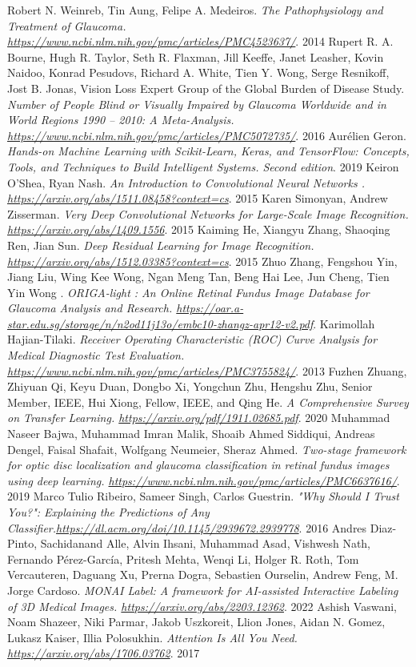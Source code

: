 \documentclass[11pt, a4paper]{article}
\begin{document}
\begin{thebibliography}{9}
\bibitem{}
Robert N. Weinreb, Tin Aung, Felipe A. Medeiros. \emph{The Pathophysiology and Treatment of Glaucoma. \url{https://www.ncbi.nlm.nih.gov/pmc/articles/PMC4523637/}}. 2014
\bibitem{}
Rupert R. A. Bourne, Hugh R. Taylor, Seth R. Flaxman, Jill Keeffe, Janet Leasher, Kovin Naidoo, Konrad Pesudovs, Richard A. White, Tien Y. Wong, Serge Resnikoff, Jost B. Jonas, Vision Loss Expert Group of the Global Burden of Disease Study. \emph{Number of People Blind or Visually Impaired by Glaucoma Worldwide and in World Regions 1990 – 2010: A Meta-Analysis. \url{https://www.ncbi.nlm.nih.gov/pmc/articles/PMC5072735/}}. 2016
\bibitem{}
Aurélien Geron. \emph{Hands-on Machine Learning with Scikit-Learn, Keras, and TensorFlow: Concepts, Tools, and Techniques to Build Intelligent Systems. Second edition}. 2019
\bibitem{}
Keiron O'Shea, Ryan Nash. \emph{An Introduction to Convolutional Neural Networks
. \url{https://arxiv.org/abs/1511.08458?context=cs}}. 2015
\bibitem{}
Karen Simonyan, Andrew Zisserman. \emph{Very Deep Convolutional Networks for Large-Scale Image Recognition. \url{https://arxiv.org/abs/1409.1556}}. 2015
\bibitem{}
Kaiming He, Xiangyu Zhang, Shaoqing Ren, Jian Sun. \emph{Deep Residual Learning for Image Recognition. \url{https://arxiv.org/abs/1512.03385?context=cs}}. 2015
\bibitem{}
Zhuo Zhang, Fengshou Yin, Jiang Liu, Wing Kee Wong,
Ngan Meng Tan, Beng Hai Lee, Jun Cheng, Tien Yin Wong . \emph{ORIGA-light : An Online Retinal Fundus Image Database for Glaucoma Analysis and Research. \url{https://oar.a-star.edu.sg/storage/n/n2od11j13o/embc10-zhangz-apr12-v2.pdf}}. 
\bibitem{}
Karimollah Hajian-Tilaki. \emph{Receiver Operating Characteristic (ROC) Curve Analysis for Medical Diagnostic Test Evaluation. \url{https://www.ncbi.nlm.nih.gov/pmc/articles/PMC3755824/}}. 2013
\bibitem{}
Fuzhen Zhuang, Zhiyuan Qi, Keyu Duan, Dongbo Xi, Yongchun Zhu, Hengshu Zhu, Senior Member, IEEE,
Hui Xiong, Fellow, IEEE, and Qing He. \emph{A Comprehensive Survey on Transfer Learning. \url{https://arxiv.org/pdf/1911.02685.pdf}}. 2020 
\bibitem{}
Muhammad Naseer Bajwa, Muhammad Imran Malik, Shoaib Ahmed Siddiqui, Andreas Dengel, Faisal Shafait, Wolfgang Neumeier, Sheraz Ahmed. \emph{Two-stage framework for optic disc localization and glaucoma classification in retinal fundus images using deep learning. \url{https://www.ncbi.nlm.nih.gov/pmc/articles/PMC6637616/}}. 2019
\bibitem{}
Marco Tulio Ribeiro, Sameer Singh, Carlos Guestrin. \emph{"Why Should I Trust You?": Explaining the Predictions of Any Classifier.\url{https://dl.acm.org/doi/10.1145/2939672.2939778}}. 2016
\bibitem{}
Andres Diaz-Pinto, Sachidanand Alle, Alvin Ihsani, Muhammad Asad, Vishwesh Nath, Fernando Pérez-García, Pritesh Mehta, Wenqi Li, Holger R. Roth, Tom Vercauteren, Daguang Xu, Prerna Dogra, Sebastien Ourselin, Andrew Feng, M. Jorge Cardoso. \emph{MONAI Label: A framework for AI-assisted Interactive Labeling of 3D Medical Images. \url{https://arxiv.org/abs/2203.12362}}. 2022
\bibitem{}
Ashish Vaswani, Noam Shazeer, Niki Parmar, Jakob Uszkoreit, Llion Jones, Aidan N. Gomez, Lukasz Kaiser, Illia Polosukhin. \emph{Attention Is All You Need. \url{https://arxiv.org/abs/1706.03762}}. 2017

\end{thebibliography}
\end{document}
